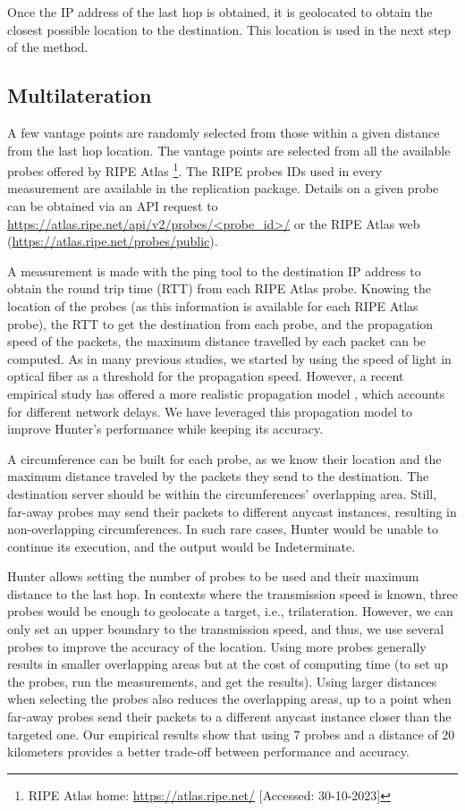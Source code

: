 \documentclass[preprint,12pt]{elsarticle}
\begin{document}
Once the IP address of the last hop is obtained, it is geolocated to obtain the closest possible location to the destination. This location is used in the next step of the method.

\subsection{Multilateration}
A few vantage points are randomly selected from those within a given distance from the last hop location. The vantage points are selected from all the available probes offered by RIPE Atlas \footnote{RIPE Atlas home: \url{https://atlas.ripe.net/} [Accessed: 30-10-2023]}. The RIPE probes IDs used in every measurement are available in the replication package. Details on a given probe can be obtained via an API request to \url{https://atlas.ripe.net/api/v2/probes/<probe_id>/} or the RIPE Atlas web (\url{https://atlas.ripe.net/probes/public}).

A measurement is made with the ping tool to the destination IP address to obtain the round trip time (RTT) from each RIPE Atlas probe. Knowing the location of the probes (as this information is available for each RIPE Atlas probe), the RTT to get the destination from each probe, and the propagation speed of the packets, the maximum distance travelled by each packet can be computed. As in many previous studies, we started by using the speed of light in optical fiber as a threshold for the propagation speed. However, a recent empirical study has offered a more realistic propagation model \cite{Kohls2022VerLoc:Systems}, which accounts for different network delays. We have leveraged this propagation model to improve Hunter's performance while keeping its accuracy.

A circumference can be built for each probe, as we know their location and the maximum distance traveled by the packets they send to the destination. The destination server should be within the circumferences’ overlapping area. Still, far-away probes may send their packets to different anycast instances, resulting in non-overlapping circumferences. In such rare cases, Hunter would be unable to continue its execution, and the output would be Indeterminate.

Hunter allows setting the number of probes to be used and their maximum distance to the last hop. In contexts where the transmission speed is known, three probes would be enough to geolocate a target, i.e., trilateration. However, we can only set an upper boundary to the transmission speed, and thus, we use several probes to improve the accuracy of the location. Using more probes generally results in smaller overlapping areas but at the cost of computing time (to set up the probes, run the measurements, and get the results). Using larger distances when selecting the probes also reduces the overlapping areas, up to a point when far-away probes send their packets to a different anycast instance closer than the targeted one. Our empirical results show that using 7 probes and a distance of 20 kilometers provides a better trade-off between performance and accuracy.
\end{document}
